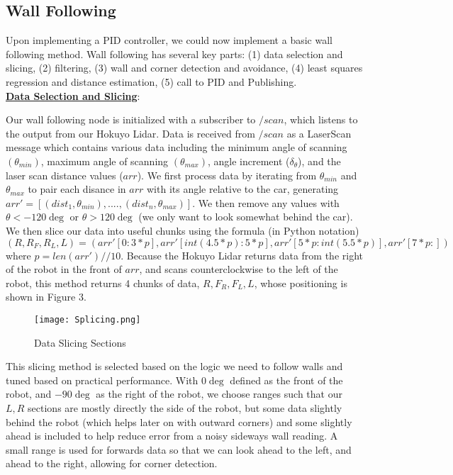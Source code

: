 \documentclass{article}
\begin{document}
\subsection{Wall Following}
Upon implementing a PID controller, we could now implement a basic wall following method. Wall following has several key parts: (1) data selection and slicing, (2) filtering, (3) wall and corner detection and avoidance, (4) least squares regression and distance estimation, (5) call to PID and Publishing.\\

\textbf{\underline{Data Selection and Slicing}}: 

Our wall following node is initialized with a subscriber to $/scan$, which listens to the output from our Hokuyo Lidar. Data is received from $/scan$ as a LaserScan message which contains various data including the minimum angle of scanning $(\theta_{min})$, maximum angle of scanning $(\theta_{max})$, angle increment ($\delta_{\theta}$), and the laser scan distance values ($arr$). We first process data by iterating from $\theta_{min}$ and $\theta_{max}$ to pair each disance in $arr$ with its angle relative to the car, generating $arr' = [(dist_1,\theta_{min}),....,(dist_n,\theta_{max})]$. We then remove any values with $\theta < -120\deg$ or $\theta > 120\deg$ (we only want to look somewhat behind the car). We then slice our data into useful chunks using the formula (in Python notation)
\begin{equation}
    ({R,R_F,R_L,L}) = (arr'[0:3*p],arr'[int(4.5*p):5*p],arr'[5*p:int(5.5*p)], arr'[7*p:])
\end{equation}
where $p=len(arr')//10$. Because the Hokuyo Lidar returns data from the right of the robot in the front of $arr$, and scans counterclockwise to the left of the robot, this method returns 4 chunks of data, $R,F_R,F_L,L$, whose positioning is shown in Figure 3. \\

\begin{figure}[h]
\begin{center}
\texttt{[image: Splicing.png]} %
\caption{Data Slicing Sections}
\end{center}
\label{workflow}
\end{figure}

This slicing method is selected based on the logic we need to follow walls and tuned based on practical performance. With $0\deg$ defined as the front of the robot, and $-90\deg$ as the right of the robot, we choose ranges such that our $L,R$ sections are mostly directly the side of the robot, but some data slightly behind the robot (which helps later on with outward corners) and some slightly ahead is included to help reduce error from a noisy sideways wall reading. A small range is used for forwards data so that we can look ahead to the left, and ahead to the right, allowing for corner detection.\\
\end{document}
